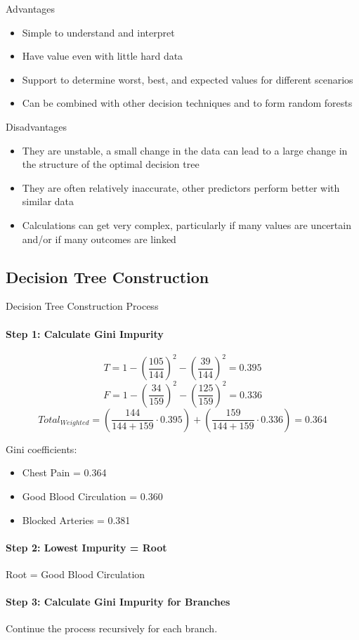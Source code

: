 \begin{concept}{Advantages}
\begin{itemize}
    \item Simple to understand and interpret
    \item Have value even with little hard data
    \item Support to determine worst, best, and expected values for different scenarios
    \item Can be combined with other decision techniques and to form random forests
\end{itemize}
\end{concept}

\begin{concept}{Disadvantages}
\begin{itemize}
    \item They are unstable, a small change in the data can lead to a large change in the structure of the optimal decision tree
    \item They are often relatively inaccurate, other predictors perform better with similar data
    \item Calculations can get very complex, particularly if many values are uncertain and/or if many outcomes are linked
\end{itemize}
\end{concept}

\subsection{Decision Tree Construction}

\begin{KR}{Decision Tree Construction Process}\\
\paragraph{Step 1: Calculate Gini Impurity}
$$T = 1 - \left(\frac{105}{144}\right)^2 - \left(\frac{39}{144}\right)^2 = 0.395$$
$$F = 1 - \left(\frac{34}{159}\right)^2 - \left(\frac{125}{159}\right)^2 = 0.336$$
$$Total_{Weighted} = \left(\frac{144}{144 + 159} \cdot 0.395\right) + \left(\frac{159}{144 + 159} \cdot 0.336\right) = 0.364$$

Gini coefficients:
\begin{itemize}
    \item Chest Pain = 0.364
    \item Good Blood Circulation = 0.360
    \item Blocked Arteries = 0.381
\end{itemize}

\paragraph{Step 2: Lowest Impurity = Root}
Root = Good Blood Circulation

\paragraph{Step 3: Calculate Gini Impurity for Branches}
Continue the process recursively for each branch.
\end{KR}


